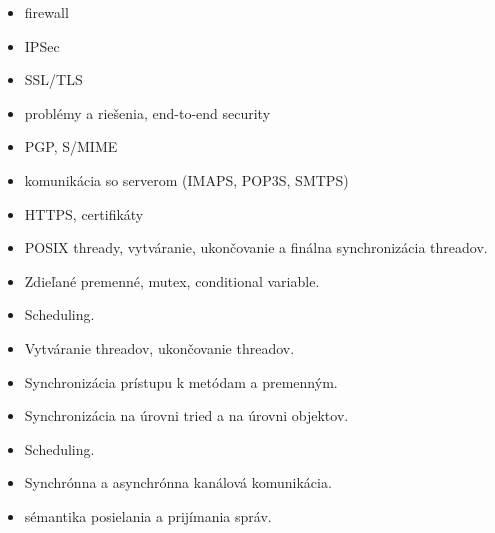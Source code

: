 \documentclass[a4paper]{report}
\begin{document}
\begin{zadanie}
\begin{itemize}
 \item firewall
 \item IPSec
 \item SSL/TLS
\end{itemize}
\end{zadanie}

\begin{zadanie}
\begin{itemize}
 \item problémy a riešenia, end-to-end security
 \item PGP, S/MIME
 \item komunikácia so serverom (IMAPS, POP3S, SMTPS)
 \item HTTPS, certifikáty
\end{itemize}
\end{zadanie}

\begin{zadanie}
\begin{itemize}
 \item POSIX thready, vytváranie, ukončovanie a finálna synchronizácia threadov.
 \item Zdieľané premenné, mutex, conditional variable.
 \item Scheduling.
\end{itemize}
\end{zadanie}

\begin{zadanie}
\begin{itemize}
 \item Vytváranie threadov, ukončovanie threadov.
 \item Synchronizácia prístupu k metódam a premenným.
 \item Synchronizácia na úrovni tried a na úrovni objektov.
 \item Scheduling.
\end{itemize}
\end{zadanie}

\begin{zadanie}
\begin{itemize}
 \item Synchrónna a asynchrónna kanálová komunikácia.
 \item sémantika posielania a prijímania správ.
\end{itemize}
\end{zadanie}
\end{document}
